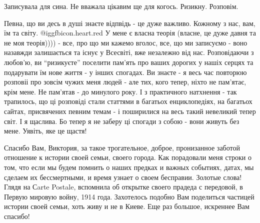 \begin{itemize}
\begin{itemize}
Записувала для сина. Не вважала цікавим ще для когось. Ризикну. Розповім.


Певна, що ви десь в душі знаєте відпвідь - це дуже важливо. Кожному з нас, вам,
їм та світу. @igg{fbicon.heart.red} У мене є власна теорія (власне, це дуже давня та не моя
теорія)))) - все, про що ми кажемо вголос, все, що ми записуємо - воно назавжди
залишається та існує у Всесвіті, вже незалежно від нас. Розповідаючи з любов'ю,
ви \enquote{ризикуєте} поселити пам'ять про ваших дорогих у нашіх серцях та подарувати
їм нове життя - у інших спогадах. Ви знаєте - я весь час повторюю розповіі про
зовсім чужих меня людей - але тих, кого тепер, ніхто не пам'ятає, крім мене. Не
пам'ятав - до минулого року. І з практичного натхнення - так трапилось, що ці
розповіді стали статтями в багатьох енциклопедіях, на багатьох сайтах,
присвячених певним темам - і поширилися на весь такий невеликий тепер світ. І я
щаслива. Бо тепер я не заберу ці спогади з собою - вони живуть без мене.
Уявіть, яке це щастя!

\end{itemize} %


Спасибо Вам, Виктория, за такое трогательное, доброе, пронизанное заботой
отношение к истории своей семьи, своего города. Как порадовали меня строки о
том, что если мы будем помнить о наших предках и важных событиях, датах, мы
сделаем их бессмертными, и время узнает о своем бесправии. Золотые слова! Глядя
на Сarte Postale, вспомнила об открытке своего прадеда с передовой, в Первую
мировую войну, 1914 года. Захотелось подобно Вам поделиться частицей истории
своей семьи, хоть живу и не в Киеве. Еще раз большое, искреннее Вам спасибо!

\begin{itemize} %


\end{itemize}
\end{itemize}
